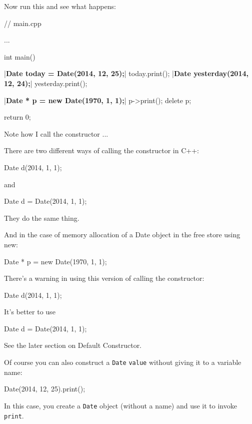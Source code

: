 Now run this and see what happens:

\begin{consolethree}[escapeinside=||]
// main.cpp

...

int main()
{
    |\textbf{Date today = Date(2014, 12, 25);}|
    today.print();
    |\textbf{Date yesterday(2014, 12, 24);}|
    yesterday.print();

    |\textbf{Date * p = new Date(1970, 1, 1);}|
    p->print();
    delete p;

    return 0;
}
\end{consolethree}

Note how I call the constructor ...

There are two different ways of calling the constructor in C++:

\begin{consolethree}[escapeinside=||]
Date d(2014, 1, 1);
\end{consolethree}

and

\begin{consolethree}[escapeinside=||]
Date d = Date(2014, 1, 1);
\end{consolethree}

They do the same thing.

And in the case of memory allocation of a Date object in the free store
using new:

\begin{consolethree}[escapeinside=||]
Date * p = new Date(1970, 1, 1);
\end{consolethree}

There's a warning in using this version of calling the constructor:

\begin{consolethree}[escapeinside=||]
Date d(2014, 1, 1);
\end{consolethree}

It's better to use

\begin{consolethree}[escapeinside=||]
Date d = Date(2014, 1, 1);
\end{consolethree}

See the later section on Default Constructor.

Of course you can also construct a \texttt{Date} \texttt{value} without
giving it to a variable name:

\begin{consolethree}[escapeinside=||]
Date(2014, 12, 25).print();
\end{consolethree}

In this case, you create a \texttt{Date} object (without a name) and use
it to invoke \texttt{print}.




